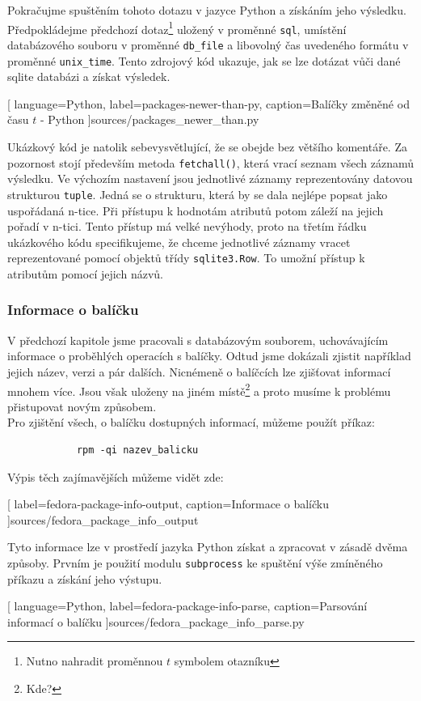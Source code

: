 \documentclass[
  field=inf,
  biblatex,
  glossaries,
  index
]{kidiplom}
\begin{document}
		Pokračujme spuštěním tohoto dotazu v jazyce Python a získáním jeho výsledku. Předpokládejme předchozí dotaz\footnote{Nutno nahradit proměnnou $t$ symbolem otazníku} uložený v proměnné \texttt{sql}, umístění databázového souboru v proměnné \texttt{db\_file} a libovolný čas uvedeného formátu v proměnné \texttt{unix\_time}. Tento zdrojový kód ukazuje, jak se lze dotázat vůči dané sqlite databázi a získat výsledek.

		
		[
			language=Python,
			label=packages-newer-than-py,
			caption={Balíčky změněné od času $t$ - Python}
		]{sources/packages_newer_than.py}

		Ukázkový kód je natolik sebevysvětlující, že se obejde bez většího komentáře. Za pozornost stojí především metoda \texttt{fetchall()}, která vrací seznam všech záznamů výsledku. Ve výchozím nastavení jsou jednotlivé záznamy reprezentovány datovou strukturou \texttt{tuple}. Jedná se o strukturu, která by se dala nejlépe popsat jako uspořádaná n-tice. Při přístupu k hodnotám atributů potom záleží na jejich pořadí v n-tici. Tento přístup má velké nevýhody, proto na třetím řádku ukázkového kódu specifikujeme, že chceme jednotlivé záznamy vracet reprezentované pomocí objektů třídy \texttt{sqlite3.Row}. To umožní přístup k atributům pomocí jejich názvů.

		\pagebreak
		\subsubsection{Informace o balíčku}
		V předchozí kapitole jsme pracovali s databázovým souborem, uchovávajícím informace o proběhlých operacích s balíčky. Odtud jsme dokázali zjistit například jejich název, verzi a pár dalších. Nicnémeně o balíčcích lze zjišťovat informací mnohem více. Jsou však uloženy na jiném místě\footnote{Kde?} a proto musíme k problému přistupovat novým způsobem.
		\\
		Pro zjištění všech, o balíčku dostupných informací, můžeme použít příkaz:

		\begin{lstlisting}
			rpm -qi nazev_balicku
		\end{lstlisting}

		Výpis těch zajímavějších můžeme vidět zde:
		
		[
			label=fedora-package-info-output,
			caption={Informace o balíčku}
		]{sources/fedora_package_info_output}

		Tyto informace lze v prostředí jazyka Python získat a zpracovat v zásadě dvěma způsoby. Prvním je použití modulu \texttt{subprocess} ke spuštění výše zmíněného příkazu a získání jeho výstupu.
		
		[
			language=Python,
			label=fedora-package-info-parse,
			caption={Parsování informací o balíčku}
		]{sources/fedora_package_info_parse.py}
\end{document}

